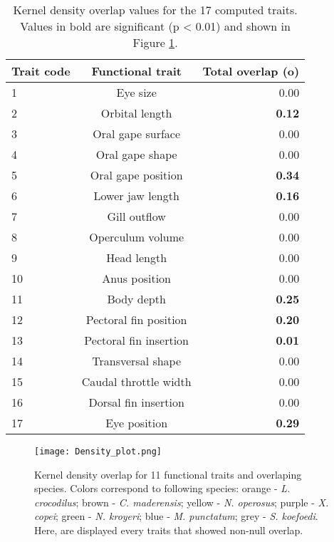 \begin{table}[ht]
\centering
\caption{Kernel density overlap values for the 17 computed traits. Values in bold are significant (p < 0.01) and shown in Figure \ref{fig:dpo}.}
\label{table:kern_over_val}
\begin{adjustbox}{max width=1.1\textwidth,center}
\begin{tabular}{lcr}
  \hline
Trait code & Functional trait & Total overlap (o) \\ 
  \hline
1 & Eye size & 0.00 \\ 
  2 & Orbital length & \textbf{0.12} \\ 
  3 & Oral gape surface & 0.00 \\ 
  4 & Oral gape shape &0.00 \\ 
  5 & Oral gape position & \textbf{0.34} \\ 
  6 & Lower jaw length & \textbf{0.16} \\ 
  7 & Gill outflow & 0.00 \\ 
  8 & Operculum volume & 0.00 \\ 
  9 & Head length & 0.00 \\ 
  10 & Anus position & 0.00 \\ 
  11 & Body depth & \textbf{0.25} \\ 
  12 & Pectoral fin position & \textbf{0.20} \\ 
  13 & Pectoral fin insertion & \textbf{0.01} \\ 
  14 & Transversal shape & 0.00 \\ 
  15 & Caudal throttle width & 0.00 \\ 
  16 & Dorsal fin insertion & 0.00 \\ 
  17 & Eye position & \textbf{0.29} \\ 
   \hline
\end{tabular}
\end{adjustbox}
\end{table} 

\begin{figure} [!htbp]
	\begin{center}
		\texttt{[image: Density\_plot.png]}
	\end{center}
	\caption{Kernel density overlap for 11 functional traits and overlaping species. Colors correspond to following species: orange - \textit{L. crocodilus}; brown - \textit{C. maderensis}; yellow - \textit{N. operosus}; purple - \textit{X. copei}; green - \textit{N. kroyeri}; blue - \textit{M. punctatum}; grey - \textit{S. koefoedi}. Here, are displayed every traits that showed non-null overlap.}
	\label{fig:dpo}
\end{figure}